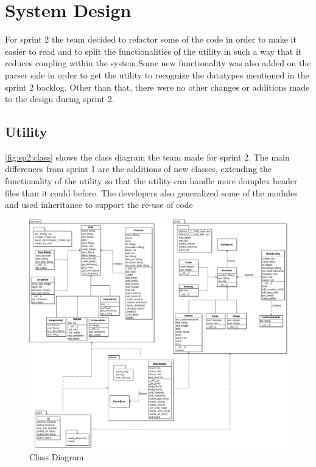 \section{System Design}
For sprint 2 the team decided to refactor some of the code in order to make it easier to read and to split the functionalities of the utility in such a way that it reduces coupling within the system.Some new functionality was also added on the parser side in order to get the utility to recognize the datatypes mentioned in the sprint 2 backlog. Other than that, there were no other changes or additions made to the design during sprint 2.

\subsection{Utility}
\autoref{fig:sp2:class} shows the class diagram the team made for sprint 2. The main differences from sprint 1 are the additions of new classes, extending the functionality of the utility so that the utility can handle more domplex header files than it could before. The developers also generalized some of the modules and used inheritance to support the re-use of code 
\begin{figure}[!htb]
	\center
	\includegraphics[width=\textwidth]{./sprints/img/class_diagram_s2}
	\caption{Class Diagram\label{fig:sp2:class}}
\end{figure}




